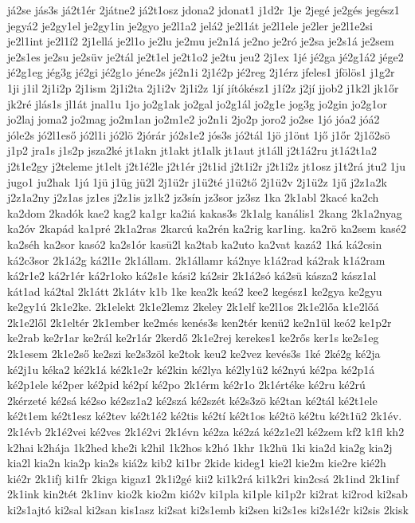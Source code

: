 {já2se
jás3s
já2t1ér
2játne2
já2t1osz
jdona2
jdonat1
j1d2r
1je
2jegé
je2gés
jegész1
jegyá2
je2gy1el
je2gy1in
je2gyo
je2l1a2
jelá2
je2l1át
je2l1ele
je2ler
je2l1e2si
je2l1int
je2l1í2
2j1ellá
je2l1o
je2lu
je2mu
je2n1á
je2no
je2ró
je2sa
je2s1á
je2sem
je2s1es
je2su
je2süv
je2tál
je2t1el
je2t1o2
je2tu
jeu2
2j1ex
1jé
jé2ga
jé2g1á2
jége2
jé2g1eg
jég3g
jé2gi
jé2g1o
jéne2s
jé2n1i
2j1é2p
jé2reg
2j1érz
jfeles1
jfölös1
j1g2r
1ji
j1il
2j1i2p
2j1ism
2j1i2ta
2j1i2v
2j1i2z
1jí
jítókész1
j1í2z
j2jí
jjob2
j1k2l
jk1őr
jk2ré
jlás1s
jl1át
jnal1u
1jo
jo2g1ak
jo2gal
jo2g1ál
jo2g1e
jog3g
jo2gin
jo2g1or
jo2laj
joma2
jo2mag
jo2m1an
jo2m1e2
jo2n1i
2jo2p
joro2
jo2se
1jó
jóa2
jóá2
jóle2s
jó2l1eső
jó2l1i
jó2lö
2jórár
jó2s1e2
jós3s
jó2tál
1jö
j1önt
1jő
j1őr
2j1ő2sö
j1p2
jra1s
j1s2p
jsza2ké
jt1akn
jt1akt
jt1alk
jt1aut
jt1áll
j2t1á2ru
jt1á2t1a2
j2t1e2gy
j2teleme
jt1elt
j2t1é2le
j2t1ér
j2t1id
j2t1i2r
j2t1i2z
jt1osz
j1t2rá
jtu2
1ju
jugo1
ju2hak
1jú
1jü
j1üg
jü2l
2j1ü2r
j1ü2té
j1ü2tő
2j1ü2v
2j1ü2z
1jű
j2z1a2k
j2z1a2ny
j2z1as
jz1es
j2z1is
jz1k2
jz3sín
jz3sor
jz3sz
1ka
2k1abl
2kacé
ka2ch
ka2dom
2kadók
kae2
kag2
ka1gr
ka2iá
kakas3s
2k1alg
kanális1
2kang
2k1a2nyag
ka2óv
2kapád
ka1pré
2k1a2ras
2karcú
ka2rén
ka2rig
kar1ing.
ka2rö
ka2sem
kasé2
ka2séh
ka2sor
kasó2
ka2s1ór
kasü2l
ka2tab
ka2uto
ka2vat
kazá2
1ká
ká2csin
ká2c3sor
2k1á2g
ká2l1e
2k1állam.
2k1államr
ká2nye
k1á2rad
ká2rak
k1á2ram
ká2r1e2
ká2r1ér
ká2r1oko
ká2s1e
kási2
ká2sir
2k1á2só
ká2sü
kásza2
kász1al
kát1ad
ká2tal
2k1átt
2k1átv
k1b
1ke
kea2k
keá2
kee2
kegész1
ke2gya
ke2gyu
ke2gy1ú
2k1e2ke.
2k1elekt
2k1e2lemz
2keley
2k1elf
ke2l1os
2k1e2lőa
k1e2lőá
2k1e2lől
2k1eltér
2k1ember
ke2més
kenés3s
ken2tér
kenü2
ke2n1ül
keó2
ke1p2r
ke2rab
ke2r1ar
ke2rál
ke2r1ár
2kerdő
2k1e2rej
kerekes1
ke2rős
ker1s
ke2s1eg
2k1esem
2k1e2ső
ke2szi
ke2s3zöl
ke2tok
keu2
ke2vez
kevés3s
1ké
2ké2g
ké2ja
ké2j1u
kéka2
ké2k1á
ké2k1e2r
ké2kin
ké2lya
ké2ly1ü2
ké2nyú
ké2pa
ké2p1á
ké2p1ele
ké2per
ké2pid
ké2pí
ké2po
2k1érm
ké2r1o
2k1értéke
ké2ru
ké2rú
2kérzeté
ké2sá
ké2so
ké2sz1a2
ké2szá
ké2szét
ké2s3zö
ké2tan
ké2tál
ké2t1ele
ké2t1em
ké2t1esz
ké2tev
ké2t1é2
ké2tis
ké2tí
ké2t1os
ké2tö
ké2tu
ké2t1ü2
2k1év.
2k1évb
2k1é2vei
ké2ves
2k1é2vi
2k1évn
ké2za
ké2zá
ké2z1e2l
ké2zem
kf2
k1fl
kh2
k2hai
k2hája
1k2hed
khe2i
k2hil
1k2hos
k2hó
1khr
1k2hü
1ki
kia2d
kia2g
kia2j
kia2l
kia2n
kia2p
kia2s
kiá2z
kib2
ki1br
2kide
kideg1
kie2l
kie2m
kie2re
kié2h
kié2r
2k1ifj
ki1fr
2kiga
kigaz1
2k1i2gé
kii2
ki1k2rá
ki1k2ri
kin2csá
2k1ind
2k1inf
2k1ink
kin2tét
2k1inv
kio2k
kio2m
kió2v
ki1pla
ki1ple
ki1p2r
ki2rat
ki2rod
ki2sab
ki2s1ajtó
ki2sal
ki2san
kis1asz
ki2sat
ki2s1emb
ki2sen
ki2s1es
ki2s1é2r
ki2sis
2kisk
}
